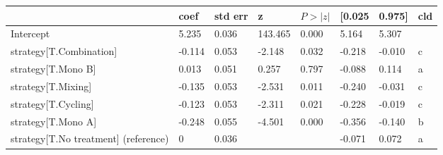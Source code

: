 \begin{tabular}{llllllll}
\toprule
 & coef & std err & z & $P>|z|$ & [0.025 & 0.975] & cld \\
\midrule
Intercept & 5.235 & 0.036 &   143.465 &  0.000 & 5.164 & 5.307 &  \\
strategy[T.Combination] & -0.114 & 0.053 &    -2.148 &  0.032 & -0.218 & -0.010 & c \\
strategy[T.Mono B] & 0.013 & 0.051 &     0.257 &  0.797 & -0.088 & 0.114 & a \\
strategy[T.Mixing] & -0.135 & 0.053 &    -2.531 &  0.011 & -0.240 & -0.031 & c \\
strategy[T.Cycling] & -0.123 & 0.053 &    -2.311 &  0.021 & -0.228 & -0.019 & c \\
strategy[T.Mono A] & -0.248 & 0.055 &    -4.501 &  0.000 & -0.356 & -0.140 & b \\
strategy[T.No treatment] (reference) & 0 & 0.036 &  &  & -0.071 & 0.072 & a \\
\bottomrule
\end{tabular}
